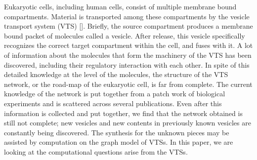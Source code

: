 
Eukaryotic cells, including human cells, consist of multiple membrane
bound compartments.
%
Material is transported among these compartments by the vesicle
transport system (VTS) [].
%
Briefly, the source compartment produces a membrane bound packet of
molecules called a vesicle.
%
After release, this vesicle specifically recognizes the correct target
compartment within the cell, and fuses with it.
%
A lot of information about the molecules that form the machinery of
the VTS has been discovered, including their regulatory interaction
with each other. 
%
In spite of this detailed knowledge at the level of the molecules, the
structure of the VTS network, or the road-map of the eukaryotic cell,
is far from complete.
%
The current knowledge of the network is put together from a patch work
of biological experiments and is scattered across several publications.
%
Even after this information is collected and put together, we find
that the network obtained is still not complete; new vesicles and new
contents in previously known vesicles are constantly being discovered.
%
The synthesis for the unknown pieces may be assisted by computation on
the graph model of VTSs.
%
% 
%
%
%
%
%
In this paper, we are looking at the computational questions 
arise from the VTSs.


